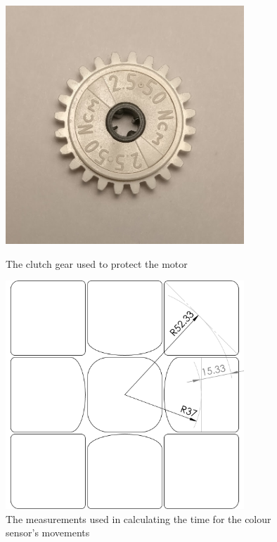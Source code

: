 \documentclass{report}
\begin{document}
	\begin{figure}[H]
		\centering
		\begin{minipage}{0.4\textwidth}
			\centering
			\includegraphics[width=0.8\textwidth]{Resources/Images/imgClutchGear.jpg}
			\caption{The clutch gear used to protect the motor}
			\label{fig:imgClutchGear}
		\end{minipage}%
		\hspace{10mm}
		\begin{minipage}{0.4\textwidth}
			\centering
			\includegraphics[width=0.8\textwidth]{Resources/Images/dwgCubeProfileCentreArcs.png}
			\caption{The measurements used in calculating the time for the colour sensor's movements}
			\label{fig:dwgCubeProfileCentreArcs}
		\end{minipage}
	\end{figure}
	
\end{document}
